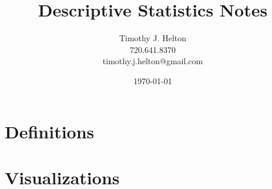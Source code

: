 \documentclass{article}
\newcommand{\mytitle}{Descriptive Statistics Notes}
\begin{document}
\author{Timothy J. Helton\\720.641.8370\\timothy.j.helton@gmail.com}
\date{\today}
\title{\mytitle}

\maketitle
\newpage

\tableofcontents
\newpage

\listoffigures
\listoftables
\newpage

\section{Definitions}

\section{Visualizations}

\end{document}
